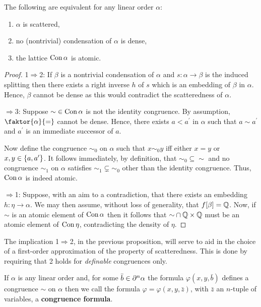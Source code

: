 \begin{prp}
	\label{prp:cscat}
	The following are equivalent for any linear order $\alpha$:
	\begin{enumerate}
		\item  $\alpha$ is scattered,
		\item  no (nontrivial) condensation of $\alpha$ is dense,
		\item  the lattice $\con\alpha$ is atomic.
	\end{enumerate}
\end{prp}
\begin{proof}
	1$\Rightarrow$2:  If $\beta$ is a nontrivial condensation of $\alpha$ and
	$s\colon\alpha\to\beta$ is the induced splitting then there exists a right
	inverse $h$ of $s$ which is an embedding of $\beta$ in $\alpha$.  Hence,
	$\beta$ cannot be dense as this would contradict the scatteredness of
	$\alpha$.

	\smallskip{}$\Rightarrow$3:  Suppose ${\sim}\in\con\alpha$ is not the identity
	congruence.  By assumption, $\faktor{\alpha}{=}$ cannot be dense.  Hence,
	there exists $a<a^\prime$ in $\alpha$ such that $a\sim a^\prime$ and
	$a^\prime$ is an immediate successor of $a$.

	Now define the congruence $\sim_0$ on $\alpha$ such that $x\sim_0 y$ iff
	either $x=y$ or $x,y\in\set{a,a^\prime}$.  It follows immediately, by
	definition, that ${\sim_0}\subseteq{\sim}$ and no congruence $\sim_1$ on
	$\alpha$ satisfies ${\sim_1}\subsetneq{\sim_0}$ other than the identity
	congruence.  Thus, $\con\alpha$ is indeed atomic.

	\smallskip{}$\Rightarrow$1:  Suppose, with an aim to a
	contradiction, that there exists an embedding $h\colon\eta\to\alpha$.  We
	may then assume, without loss of generality, that $f[\beta]=\rats$.  Now, if
	$\sim$ is an atomic element of $\con\alpha$ then it follows that
	${\sim}\cap\rats\times\rats$ must be an atomic element of $\con\eta$,
	contradicting the density of $\eta$.
\end{proof}

The implication 1$\Rightarrow$2, in the previous proposition, will serve to aid
in the choice of a first-order approximation of the property of scatteredness.
This is done by requiring that 2 holds for \textit{definable} congruences only.

\begin{dfn}
	If $\alpha$ is any linear order and, for some $\bar{b}\in\domain[n]{\alpha}$
	the formula $\varphi(x,y,\bar{b})$ defines a congruence $\sim$ on $\alpha$
	then we call the formula $\varphi=\varphi(x,y,\bar{z})$, with $\bar{z}$ an
	$n$-tuple of variables, a \textbf{congruence formula}.
\end{dfn}

